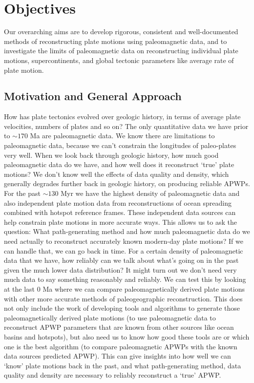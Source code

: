 \section{Objectives}

Our overarching aims are to develop rigorous, consistent and well-documented
methods of reconstructing plate motions using paleomagnetic data, and to
investigate the limits of paleomagnetic data on reconstructing individual plate
motions, supercontinents, and global tectonic parameters like average rate of
plate motion.

\subsection{Motivation and General Approach}

How has plate tectonics evolved over geologic history, in terms of average plate
velocities, numbers of plates and so on? The only quantitative data we have
prior to ${\sim}170$ Ma are paleomagnetic data. We know there are limitations to
paleomagnetic data, because we can't constrain the longitudes of paleo-plates
very well. When we look back through geologic history, how much good
paleomagnetic data do we have, and how well does it reconstruct `true' plate
motions? We don't know well the effects of data quality and density, which
generally degrades further back in geologic history, on producing reliable
APWPs. For the past ${\sim}130$ Myr we have the highest density of
paleomagnetic data and also independent plate motion data from reconstructions
of ocean spreading combined with hotspot reference frames. These independent
data sources can help constrain plate motions in more accurate ways. This allows
us to ask the question: What path-generating method and how much paleomagnetic
data do we need actually to reconstruct accurately known modern-day plate
motions? If we can handle that, we can go back
in time. For a certain density of paleomagnetic data that we have, how reliably
can we talk about what's going on in the past given the much lower data
distribution? It might turn out we don't need very much data to say something
reasonably and reliably. We can test this by looking at the last 0
Ma where we can compare paleomagnetically derived plate motions with other more
accurate methods of paleogeographic reconstruction. This does not only include
the work of developing tools and algorithms to generate those paleomagnetically
derived plate motions (to use paleomagnetic data to reconstruct APWP parameters
that are known from other sources like ocean basins and hotspots), but also need
us to know how good these tools are or which one is the best algorithm (to
compare paleomagnetic APWPs with the known data sources predicted APWP). This
can give insights into how well we can `know' plate motions back in the past,
and what path-generating method, data quality and density are necessary to
reliably reconstruct a `true' APWP\@.

